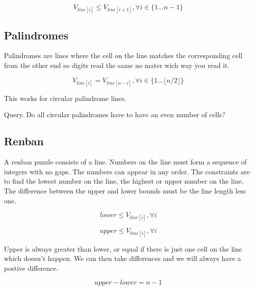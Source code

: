 \documentclass{article}
\begin{document}
\begin{equation}
V_{line[i]} \leq V_{line[i+1]}, \forall i \in \lbrace 1 ... n-1 \rbrace
\end{equation}


\subsection{Palindromes}


Palindromes are lines where the cell on the line matches the corresponding cell from the other end so digits read the same no mater wich way you read it. 

\begin{equation}
V_{line[i]} = V_{line[n-i]} , \forall i \in \lbrace 1 ...  \lfloor n /2 \rfloor \rbrace
\end{equation}

This works for circular palindrome lines. 

Query. Do all circular palindromes have to have an even number of cells? 


\subsection{Renban}

A renban puzzle consists of a line. Numbers on the line must form a sequence of integers with no gaps. The numbers can appear in any order.
The constraints are to find the lowest number on the line, the highest or upper number on the line. The difference between the upper and lower bounds
must be the line length less one. 

\begin{equation}
lower \leq V_{line[i]}, \forall i
\end{equation}

\begin{equation}
upper \leq V_{line[i]}, \forall i
\end{equation}

Upper is always greater than lower, or equal if there is just one cell on the line which doesn't happen.  We can then take differences and we will always have a postive difference. 

\begin{equation}
upper - lower = n - 1
\end{equation}
\end{document}

